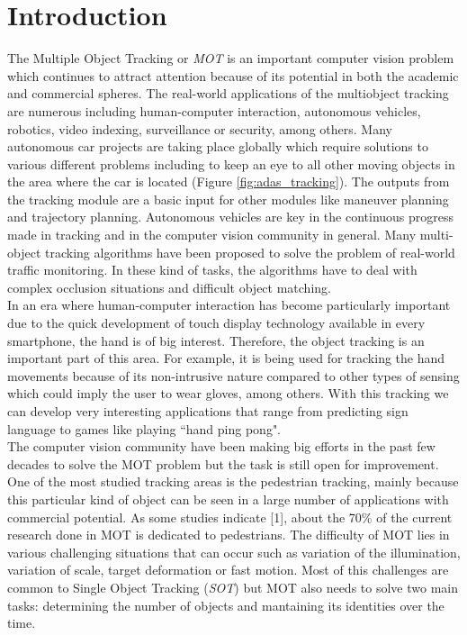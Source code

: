 \chapter{Introduction}\label{cap.introduccion}

\setlength{\parindent}{0pt}
The Multiple Object Tracking or \textit{MOT} is an important computer vision problem which continues to attract attention because of its potential in both the academic and commercial spheres. The real-world applications of the multiobject tracking are numerous including human-computer interaction, autonomous vehicles, robotics, video indexing, surveillance or security, among others. Many autonomous car projects are taking place globally which require solutions to various different problems including to keep an eye to all other moving objects in the area where the car is located (Figure \ref{fig:adas_tracking}). The outputs from the tracking module are a basic input for other modules like maneuver planning and trajectory planning. Autonomous vehicles are key in the continuous progress made in tracking and in the computer vision community in general. Many multi-object tracking algorithms have been proposed to solve the problem of real-world traffic monitoring. In these kind of tasks, the algorithms have to deal with complex occlusion situations and difficult object matching.\\
In an era where human-computer interaction has become particularly important due to the quick development of touch display technology available in every smartphone, the hand is of big interest. Therefore, the object tracking is an important part of this area. For example, it is being used for tracking the hand movements because of its non-intrusive nature compared to other types of sensing which could imply the user to wear gloves, among others. With this tracking we can develop very interesting applications that range from predicting sign language to games like playing ``hand ping pong".
\\
The computer vision community have been making big efforts in the past few decades to solve the MOT problem but the task is still open for improvement. One of the most studied tracking areas is the pedestrian tracking, mainly because this particular kind of object can be seen in a large number of applications with commercial potential. As some studies indicate [1], about the 70\% of the current research done in MOT is dedicated to pedestrians. The difficulty of MOT lies in various challenging situations that can occur such as variation of the illumination, variation of scale, target deformation or fast motion. Most of this challenges are common to Single Object Tracking (\textit{SOT}) but MOT also needs to solve two main tasks: determining the number of objects and mantaining its identities over the time.\\
